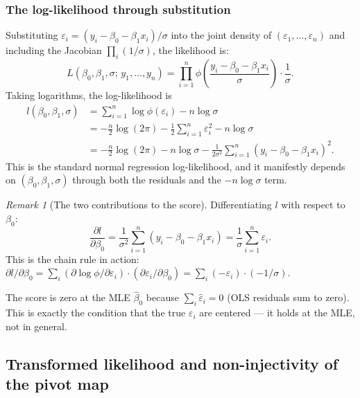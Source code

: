 \documentclass[a4paper,oneside,12pt]{extarticle}
\theoremstyle{plain}
\theoremstyle{definition}
\theoremstyle{remark}
\newtheorem{remark}[proposition]{Remark}
\begin{document}
\subsubsection*{The log-likelihood through substitution}

Substituting $\varepsilon_i = (y_i - \beta_0 - \beta_1 x_i)/\sigma$
into the joint density of $(\varepsilon_1,\ldots,\varepsilon_n)$
and including the Jacobian $\prod_i (1/\sigma)$, the likelihood is:
\[
  L(\beta_0,\beta_1,\sigma;\,y_1,\ldots,y_n)
  = \prod_{i=1}^n \phi\!\left(\frac{y_i-\beta_0-\beta_1 x_i}{\sigma}\right)
    \cdot\frac{1}{\sigma}.
\]
Taking logarithms, the log-likelihood is
\begin{align*}
  l(\beta_0,\beta_1,\sigma)
  &= \sum_{i=1}^n \log\phi(\varepsilon_i) - n\log\sigma \\[4pt]
  &= -\frac{n}{2}\log(2\pi)
     - \frac{1}{2}\sum_{i=1}^n \varepsilon_i^2
     - n\log\sigma \\[4pt]
  &= -\frac{n}{2}\log(2\pi)
     - n\log\sigma
     - \frac{1}{2\sigma^2}\sum_{i=1}^n(y_i - \beta_0 - \beta_1 x_i)^2.
\end{align*}
This is the standard normal regression log-likelihood, and it
manifestly depends on $(\beta_0, \beta_1, \sigma)$ through both
the residuals and the $-n\log\sigma$ term.

\begin{remark}[The two contributions to the score]
Differentiating $l$ with respect to $\beta_0$:
\[
  \frac{\partial l}{\partial\beta_0}
  = \frac{1}{\sigma^2}\sum_{i=1}^n (y_i - \beta_0 - \beta_1 x_i)
  = \frac{1}{\sigma}\sum_{i=1}^n\varepsilon_i.
\]
This is the chain rule in action: $\partial l/\partial\beta_0 =
\sum_i (\partial\log\phi/\partial\varepsilon_i)\cdot
(\partial\varepsilon_i/\partial\beta_0) = \sum_i (-\varepsilon_i)
\cdot(-1/\sigma)$.

The score is zero at the MLE $\hat\beta_0$ because $\sum_i
\hat\varepsilon_i = 0$ (OLS residuals sum to zero).  This is
exactly the condition that the true $\varepsilon_i$ are centered
--- it holds at the MLE, not in general.
\end{remark}


\subsection{Transformed likelihood and non-injectivity of the pivot map}
\label{subsec:transformed-likelihood}
\end{document}
